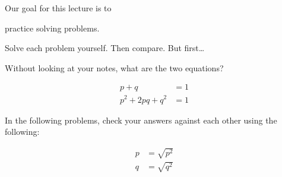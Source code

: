 \documentclass[t]{beamer}
\begin{document}
\begin{frame}{Our goal for this lecture is to}
	
	\hangpara practice solving  problems.

	\hangpara Solve each problem yourself. Then compare. But first\dots
	
\end{frame}
%

\begin{frame}{Without looking at your notes, what are the two equations?}

	\pause \vspace{-2\baselineskip}

	{\centering
	\large
	\begin{align*}
		p + q &= 1 \\
		p^2 + 2pq + q^2 &= 1
	\end{align*}	
	}
	
	\pause 
	\hangpara In the following problems, check your answers against each other using the following:
	
	\vspace{-\baselineskip}
	{\centering
	\large
	\begin{align*}
		p &= \sqrt{p^2} \\
		q &= \sqrt{q^2}
	\end{align*}	
	}
	
\end{frame}
%
\end{document}
